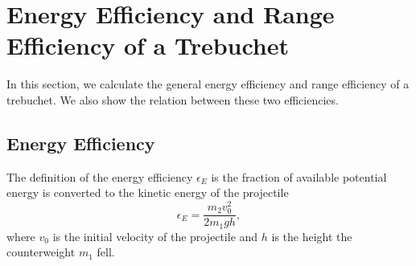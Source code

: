 \documentclass[%
reprint,
amsmath,amssymb,
aps,
]{revtex4-1}
\begin{document}
	\section{\label{sec:level2} Energy Efficiency and Range Efficiency of a Trebuchet}
	In this section, we calculate the general energy efficiency and range efficiency of a trebuchet. We also show the relation between these two efficiencies.
	\subsection{Energy Efficiency}
	The definition of the energy efficiency $\epsilon_E$ is the  fraction of available potential energy is converted
	to the kinetic energy of the projectile
	\begin{equation}
	\epsilon_E=\frac{m_2v_0^2}{2m_1gh},
	\label{EnergyEff}
	\end{equation}
	where $v_0$ is the initial velocity of the projectile and $h$ is the height the counterweight $m_1$ fell. 
\end{document}
